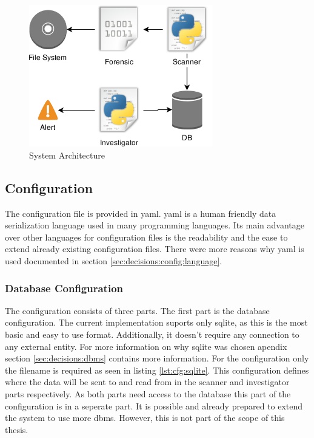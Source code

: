 \begin{figure}[ht]
  \includegraphics[width=8cm]{../img/Overview_FIDS.png}
  \centering
  \caption{System Architecture}
  \label{fig:systemArchitecture}
\end{figure}

\subsection{Configuration}
\label{sec:Configuration}

The configuration file is provided in \gls{yaml}. \gls{yaml} is a human friendly data serialization language used in many programming languages. Its main advantage over other languages for configuration files is the readability and the ease to extend already existing configuration files. There were more reasons why \gls{yaml} is used documented in section \ref{sec:decisions:config:language}.

\subsubsection{Database Configuration}

The configuration consists of three parts. The first part is the database configuration. The current implementation suports only sqlite, as this is the most basic and easy to use format. Additionally, it doesn't require any connection to any external entity. For more information on why sqlite was chosen apendix section \ref{sec:decisions:dbms} contains more information. For the configuration only the filename is required as seen in listing \ref{lst:cfg:sqlite}. This configuration defines where the data will be sent to and read from in the scanner and investigator parts respectively. As both parts need access to the database this part of the configuration is in a seperate part. It is possible and already prepared to extend the system to use more \gls{dbms}. However, this is not part of the scope of this thesis.


